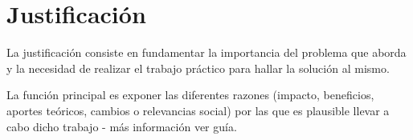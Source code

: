 \chapter{Justificación}
La justificación  consiste en fundamentar la importancia del problema que aborda y la necesidad de realizar el trabajo práctico para hallar la solución al mismo.

La función principal es exponer las diferentes razones (impacto, beneficios, aportes teóricos, cambios o relevancias social) por las que es plausible llevar a cabo dicho trabajo - más información ver guía.
